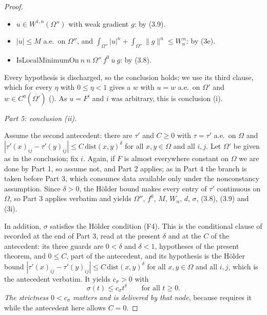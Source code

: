 \begin{proof}
\begin{itemize}
  $n,n,0,\lambda,\Lambda,1,\nu_0,\nu_1,\Omega'',f^0,\sigma$: by (3i).
\item $u\in W^{1,n}(\Omega'')$ with weak gradient $g$: by (3.9).
\item $|u|\le M$ a.e.\ on $\Omega''$, and
  $\int_{\Omega''}|u|^n+\int_{\Omega''}\|g\|^n\le W_n^{\,n}$: by (3e).
\item $\mathrm{IsLocalMinimumOn}\ n\ n\ \Omega''\ f^0\ u\ g$: by (3.8).
\end{itemize}
Every hypothesis is discharged, so the conclusion holds; we use its third clause,
which for every $\eta$ with $0\le\eta<1$ gives a $w$ with $u=w$ a.e.\ on
$\Omega'$ and $w\in C^\eta(\overline{\Omega'})$ ().  As
$u=F^i$ and $i$ was arbitrary, this is conclusion (i).

\medskip
\noindent\emph{Part 5: conclusion \textup{(ii)}.}

Assume the second antecedent: there are $\tau'$ and $C\ge0$ with
$\tau=\tau'$ a.e.\ on $\Omega$ and
$|\tau'(x)_{ij}-\tau'(y)_{ij}|\le C\,\mathrm{dist}(x,y)^\delta$ for all
$x,y\in\Omega$ and all $i,j$.  Let $\Omega'$ be given as in the conclusion; fix
$i$.  Again, if $F$ is almost everywhere constant on $\Omega$ we are done by
Part 1, so assume not, and Part 2 applies; as in Part 4 the branch is taken
before Part 3, which consumes data available only under the nonconstancy
assumption.  Since $\delta>0$, the H\"older bound makes every entry of $\tau'$
continuous on $\Omega$, so Part 3 applies verbatim and yields
$\Omega''$, $f^0$, $M$, $W_n$, $d$, $\sigma$, (3.8), (3.9) and (3i).

In addition, $\sigma$ satisfies the H\"older condition (F4).  This is the
conditional clause of  recorded at the
end of Part 3, read at the present $\delta$ and at the $C$ of the antecedent: its
three guards are $0<\delta$ and $\delta<1$, hypotheses of the present theorem,
and $0\le C$, part of the antecedent, and its hypothesis is the H\"older bound
$|\tau'(x)_{ij}-\tau'(y)_{ij}|\le C\,\mathrm{dist}(x,y)^\delta$ for all
$x,y\in\Omega$ and all $i,j$, which is the antecedent verbatim.  It yields
$c_\sigma>0$ with
\[
\sigma(t)\le c_\sigma t^\delta\qquad\text{for all }t\ge0 .
\]
\emph{The strictness $0<c_\sigma$ matters and is delivered by that node}, because
 requires it while the antecedent here allows
$C=0$.


\end{proof}
